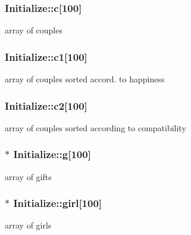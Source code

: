 \subsubsection[{\texorpdfstring{c}{c}}]{ Initialize\+::c\mbox{[}100\mbox{]}}\hypertarget{classInitialize_aaf5cb4df24e3003d80466a8f1efe2304}{}\label{classInitialize_aaf5cb4df24e3003d80466a8f1efe2304}
array of couples 
\subsubsection[{\texorpdfstring{c1}{c1}}]{ Initialize\+::c1\mbox{[}100\mbox{]}}\hypertarget{classInitialize_ad2879f7f66c574bbccf3b61cb3aac1de}{}\label{classInitialize_ad2879f7f66c574bbccf3b61cb3aac1de}
array of couples sorted accord. to happiness 
\subsubsection[{\texorpdfstring{c2}{c2}}]{ Initialize\+::c2\mbox{[}100\mbox{]}}\hypertarget{classInitialize_addf59fd3ee5e6044a0f294e37f8956b3}{}\label{classInitialize_addf59fd3ee5e6044a0f294e37f8956b3}
array of couples sorted according to compatibility 
\subsubsection[{\texorpdfstring{g}{g}}]{$\ast$ Initialize\+::g\mbox{[}100\mbox{]}}\hypertarget{classInitialize_afe44835fd27dbb25627811bd8b907f66}{}\label{classInitialize_afe44835fd27dbb25627811bd8b907f66}
array of gifts 
\subsubsection[{\texorpdfstring{girl}{girl}}]{$\ast$ Initialize\+::girl\mbox{[}100\mbox{]}}\hypertarget{classInitialize_a6a334c44226cfbc12743accd0881da87}{}\label{classInitialize_a6a334c44226cfbc12743accd0881da87}
array of girls 
